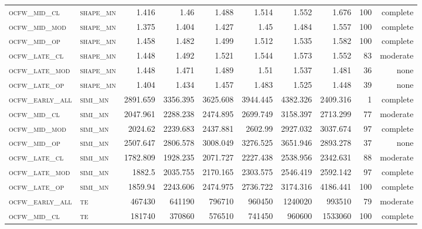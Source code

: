 \begin{landscape}
\begin{center}
\begin{footnotesize}
\begin{longtable}{llrrrrr|rrr}
\textsc{ocfw\_mid\_cl   } & \textsc{shape\_mn }    & 1.416    & 1.46     & 1.488    & 1.514    & 1.552    & 1.676    & 100 & complete \\
\textsc{ocfw\_mid\_mod  } & \textsc{shape\_mn }    & 1.375    & 1.404    & 1.427    & 1.45     & 1.484    & 1.557    & 100 & complete \\
\textsc{ocfw\_mid\_op   } & \textsc{shape\_mn }    & 1.458    & 1.482    & 1.499    & 1.512    & 1.535    & 1.582    & 100 & complete \\
\textsc{ocfw\_late\_cl  } & \textsc{shape\_mn }    & 1.448    & 1.492    & 1.521    & 1.544    & 1.573    & 1.552    & 83  & moderate \\
\textsc{ocfw\_late\_mod } & \textsc{shape\_mn }    & 1.448    & 1.471    & 1.489    & 1.51     & 1.537    & 1.481    & 36  & none     \\
\textsc{ocfw\_late\_op  } & \textsc{shape\_mn }    & 1.404    & 1.434    & 1.457    & 1.483    & 1.525    & 1.448    & 39  & none     \\
\textsc{ocfw\_early\_all} & \textsc{simi\_mn  }    & 2891.659 & 3356.395 & 3625.608 & 3944.445 & 4382.326 & 2409.316 & 1   & complete \\
\textsc{ocfw\_mid\_cl   } & \textsc{simi\_mn  }    & 2047.961 & 2288.238 & 2474.895 & 2699.749 & 3158.397 & 2713.299 & 77  & moderate \\
\textsc{ocfw\_mid\_mod  } & \textsc{simi\_mn  }    & 2024.62  & 2239.683 & 2437.881 & 2602.99  & 2927.032 & 3037.674 & 97  & complete \\
\textsc{ocfw\_mid\_op   } & \textsc{simi\_mn  }    & 2507.647 & 2806.578 & 3008.049 & 3276.525 & 3651.946 & 2893.278 & 37  & none     \\
\textsc{ocfw\_late\_cl  } & \textsc{simi\_mn  }    & 1782.809 & 1928.235 & 2071.727 & 2227.438 & 2538.956 & 2342.631 & 88  & moderate \\
\textsc{ocfw\_late\_mod } & \textsc{simi\_mn  }    & 1882.5   & 2035.755 & 2170.165 & 2303.575 & 2546.419 & 2592.142 & 97  & complete \\
\textsc{ocfw\_late\_op  } & \textsc{simi\_mn  }    & 1859.94  & 2243.606 & 2474.975 & 2736.722 & 3174.316 & 4186.441 & 100 & complete \\
\textsc{ocfw\_early\_all} & \textsc{te  	  }    & 467430   & 641190   & 796710   & 960450   & 1240020  & 993510   & 79  & moderate \\
\textsc{ocfw\_mid\_cl   } & \textsc{te        }    & 181740   & 370860   & 576510   & 741450   & 960600   & 1533060  & 100 & complete \\

\end{longtable}
\end{footnotesize}
\end{center}
\end{landscape}

